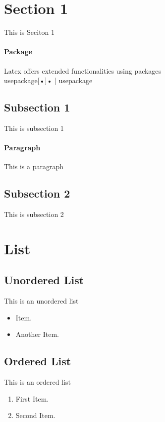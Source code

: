 \documentclass[a4paper]{article}
\begin{document}
\tableofcontents

\section{Section 1}
This is Seciton 1

\paragraph{Package} 
Latex offers extended functionalities using packages  \\ usepackage[•]{•} | usepackage{}

\subsection{Subsection 1}
This is subsection 1

\paragraph{Paragraph}
This is a paragraph

\subsection{Subsection 2}
This is subsection 2

\section{List}

\subsection{Unordered List}
This is an unordered list

\begin{itemize}
\item Item.
\item Another Item.
\end{itemize}

\subsection{Ordered List}
This is an ordered list

\begin{enumerate}
\item First Item.
\item Second Item.
\end{enumerate}
\end{document}
